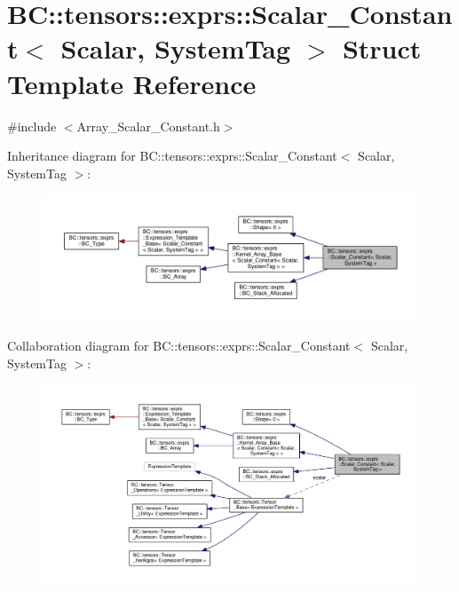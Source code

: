 \hypertarget{structBC_1_1tensors_1_1exprs_1_1Scalar__Constant}{}\section{BC\+:\+:tensors\+:\+:exprs\+:\+:Scalar\+\_\+\+Constant$<$ Scalar, System\+Tag $>$ Struct Template Reference}
\label{structBC_1_1tensors_1_1exprs_1_1Scalar__Constant}


{\ttfamily \#include $<$Array\+\_\+\+Scalar\+\_\+\+Constant.\+h$>$}



Inheritance diagram for BC\+:\+:tensors\+:\+:exprs\+:\+:Scalar\+\_\+\+Constant$<$ Scalar, System\+Tag $>$\+:
\nopagebreak
\begin{figure}[H]
\begin{center}
\leavevmode
\includegraphics[width=350pt]{structBC_1_1tensors_1_1exprs_1_1Scalar__Constant__inherit__graph}
\end{center}
\end{figure}


Collaboration diagram for BC\+:\+:tensors\+:\+:exprs\+:\+:Scalar\+\_\+\+Constant$<$ Scalar, System\+Tag $>$\+:
\nopagebreak
\begin{figure}[H]
\begin{center}
\leavevmode
\includegraphics[width=350pt]{structBC_1_1tensors_1_1exprs_1_1Scalar__Constant__coll__graph}
\end{center}
\end{figure}
